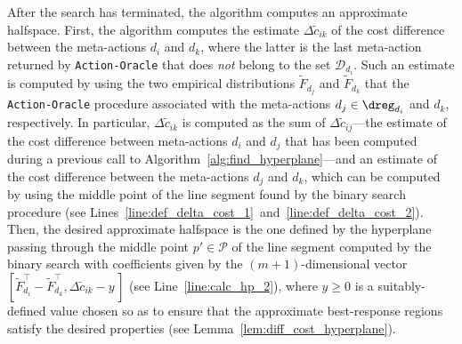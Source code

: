 After the search has terminated, the algorithm computes an approximate halfspace.
%
First, the algorithm computes the estimate $\Delta \widetilde{c}_{ik}$ of the cost difference between the meta-actions $d_i$ and $d_k$, where the latter is the last meta-action returned by \texttt{Action-Oracle} that does \emph{not} belong to the set $\mathcal{D}_{d_i}$.
%
Such an estimate is computed by using the two empirical distributions $\widetilde{F}_{d_{j}}$ and $\widetilde{F}_{d_{k}}$ that the \texttt{Action-Oracle} procedure associated with the meta-actions $d_j \in \dreg_{d_i}$ and $d_k$, respectively.
%
In particular, $\Delta \widetilde{c}_{ik}$ is computed as the sum of $\Delta \widetilde{c}_{ij}$---the estimate of the cost difference between meta-actions $d_i$ and $d_j$ that has been computed during a previous call to Algorithm~\ref{alg:find_hyperplane}---and an estimate of the cost difference between the meta-actions $d_j$ and $d_k$, which can be computed by using the middle point of the line segment found by the binary search procedure (see Lines~\ref{line:def_delta_cost_1}~and~\ref{line:def_delta_cost_2}).
%
%
%
Then, the desired approximate halfspace is the one defined by the hyperplane passing through the middle point $p' \in \mathcal{P}$ of the line segment computed by the binary search with coefficients given by the $(m+1)$-dimensional vector $[ \widetilde{F}_{d_{i}}^\top- \widetilde{F}_{d_{k}}^\top , \Delta \widetilde{c}_{ik} -y \, ]$ (see Line~\ref{line:calc_hp_2}), where $y \geq 0$ is a suitably-defined value chosen so as to ensure that the approximate best-response regions satisfy the desired properties (see Lemma~\ref{lem:diff_cost_hyperplane}). 






